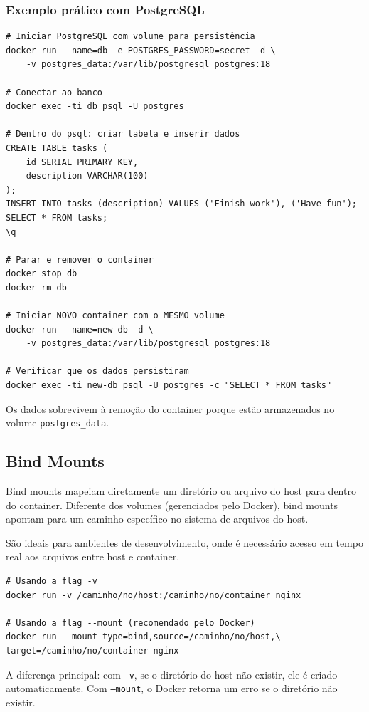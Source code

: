 \subsubsection{Exemplo prático com PostgreSQL}

\begin{verbatim}
# Iniciar PostgreSQL com volume para persistência
docker run --name=db -e POSTGRES_PASSWORD=secret -d \
    -v postgres_data:/var/lib/postgresql postgres:18

# Conectar ao banco
docker exec -ti db psql -U postgres

# Dentro do psql: criar tabela e inserir dados
CREATE TABLE tasks (
    id SERIAL PRIMARY KEY,
    description VARCHAR(100)
);
INSERT INTO tasks (description) VALUES ('Finish work'), ('Have fun');
SELECT * FROM tasks;
\q

# Parar e remover o container
docker stop db
docker rm db

# Iniciar NOVO container com o MESMO volume
docker run --name=new-db -d \
    -v postgres_data:/var/lib/postgresql postgres:18

# Verificar que os dados persistiram
docker exec -ti new-db psql -U postgres -c "SELECT * FROM tasks"
\end{verbatim}

Os dados sobrevivem à remoção do container porque estão armazenados no volume \texttt{postgres\_data}.

\subsection{Bind Mounts}

Bind mounts mapeiam diretamente um diretório ou arquivo do host para dentro do container. Diferente dos volumes (gerenciados pelo Docker), bind mounts apontam para um caminho específico no sistema de arquivos do host.

São ideais para ambientes de desenvolvimento, onde é necessário acesso em tempo real aos arquivos entre host e container.

\begin{verbatim}
# Usando a flag -v
docker run -v /caminho/no/host:/caminho/no/container nginx

# Usando a flag --mount (recomendado pelo Docker)
docker run --mount type=bind,source=/caminho/no/host,\
target=/caminho/no/container nginx
\end{verbatim}

A diferença principal: com \texttt{-v}, se o diretório do host não existir, ele é criado automaticamente. Com \texttt{--mount}, o Docker retorna um erro se o diretório não existir.

